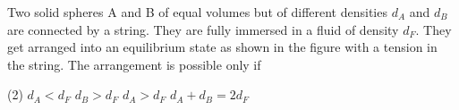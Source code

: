 
\item Two solid spheres A and B of equal volumes but of different densities \(d_A\) and \(d_B\) are connected by a string. They are fully immersed in a fluid of density \(d_F\). They get arranged into an equilibrium state as shown in the figure with a tension in the string. The arrangement is possible only if

\begin{center}
\end{center}

\begin{tasks}(2)
    \task \(d_A < d_F\)
    \task \(d_B > d_F\)
    \task \(d_A > d_F\)
    \task \(d_A + d_B = 2 d_F\)
\end{tasks}
